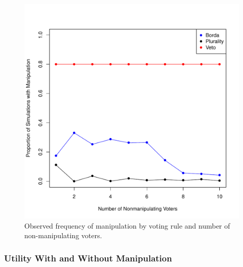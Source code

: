 \documentclass[12pt,letterpaper]{article} %
\begin{document}
\begin{figure}[h!]
\begin{center}
\includegraphics[scale=0.4]{../graphics/manipulation-frequency.pdf}
\caption{Observed frequency of manipulation by voting rule and number of non-manipulating voters.}
\label{manipulation-frequency}
\end{center}
\end{figure}

\subsubsection{Utility With and Without Manipulation}


\end{document}
